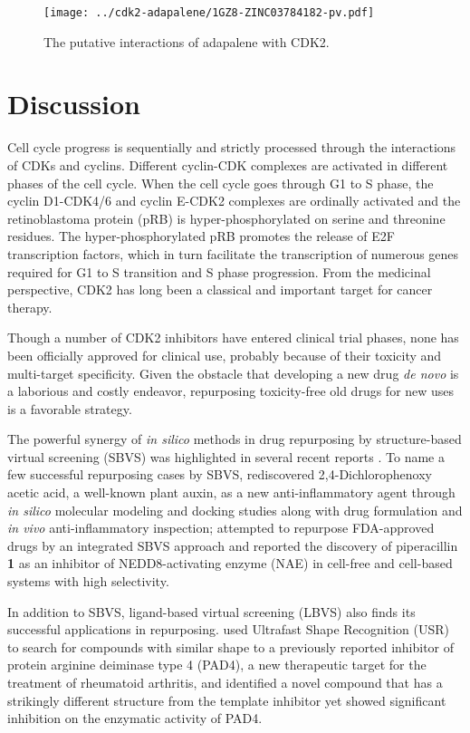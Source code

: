 \begin{figure}
\centering
\texttt{[image: ../cdk2-adapalene/1GZ8-ZINC03784182-pv.pdf]}
\caption{The putative interactions of adapalene with CDK2.}
\label{cdk2:1GZ8-ZINC03784182-pv}
\end{figure}

\section{Discussion}

Cell cycle progress is sequentially and strictly processed through the interactions of CDKs and cyclins. Different cyclin-CDK complexes are activated in different phases of the cell cycle. When the cell cycle goes through G1 to S phase, the cyclin D1-CDK4/6 and cyclin E-CDK2 complexes are ordinally activated and the retinoblastoma protein (pRB) is hyper-phosphorylated on serine and threonine residues. The hyper-phosphorylated pRB promotes the release of E2F transcription factors, which in turn facilitate the transcription of numerous genes required for G1 to S transition and S phase progression. From the medicinal perspective, CDK2 has long been a classical and important target for cancer therapy.

Though a number of CDK2 inhibitors have entered clinical trial phases, none has been officially approved for clinical use, probably because of their toxicity and multi-target specificity. Given the obstacle that developing a new drug \textit{de novo} is a laborious and costly endeavor, repurposing toxicity-free old drugs for new uses is a favorable strategy.

The powerful synergy of \textit{in silico} methods in drug repurposing by structure-based virtual screening (SBVS) was highlighted in several recent reports \citep{1384}. To name a few successful repurposing cases by SBVS, \citep{1507} rediscovered 2,4-Dichlorophenoxy acetic acid, a well-known plant auxin, as a new anti-inflammatory agent through \textit{in silico} molecular modeling and docking studies along with drug formulation and \textit{in vivo} anti-inflammatory inspection; \citep{1506} attempted to repurpose FDA-approved drugs by an integrated SBVS approach and reported the discovery of piperacillin \textbf{1} as an inhibitor of NEDD8-activating enzyme (NAE) in cell-free and cell-based systems with high selectivity.

In addition to SBVS, ligand-based virtual screening (LBVS) also finds its successful applications in repurposing. \citep{1504} used Ultrafast Shape Recognition (USR) \citep{1379} to search for compounds with similar shape to a previously reported inhibitor of protein arginine deiminase type 4 (PAD4), a new therapeutic target for the treatment of rheumatoid arthritis, and identified a novel compound that has a strikingly different structure from the template inhibitor yet showed significant inhibition on the enzymatic activity of PAD4.

